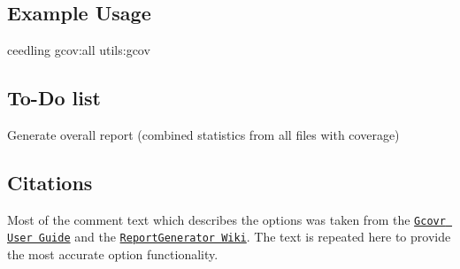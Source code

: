 \subsection*{Example Usage}


\begin{DoxyCode}
ceedling gcov:all utils:gcov
\end{DoxyCode}


\subsection*{To-\/\+Do list}


\begin{DoxyItemize}
\item Generate overall report (combined statistics from all files with coverage)
\end{DoxyItemize}

\subsection*{Citations}

Most of the comment text which describes the options was taken from the \href{https://www.gcovr.com/en/stable/guide.html}{\tt Gcovr User Guide} and the \href{https://github.com/danielpalme/ReportGenerator/wiki}{\tt Report\+Generator Wiki}. The text is repeated here to provide the most accurate option functionality. 